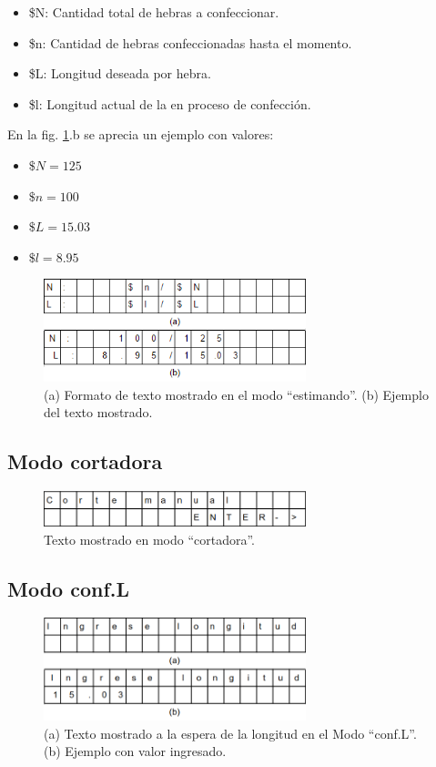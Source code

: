 \documentclass[main_conf.tex]{subfiles}
\begin{document}
\begin{itemize}
\item \$N: Cantidad total de hebras a confeccionar.
\item \$n: Cantidad de hebras confeccionadas hasta el momento.
\item \$L: Longitud deseada por hebra.
\item \$l: Longitud actual de la en proceso de confección.
\end{itemize}

En la fig. \ref{Modo_estimando}.b se aprecia un ejemplo con valores:
\begin{itemize}
\item $\$N = 125$
\item $\$n = 100$
\item $\$L = 15.03$
\item $\$l = 8.95$
\end{itemize}

\begin{figure}[!t]
  \centering
  \includegraphics[width=3.0in]{../img/modo/estimando.png}
  \caption{(a) Formato de texto mostrado en el modo “estimando”.
           (b) Ejemplo del texto mostrado.
  }
  \label{Modo_estimando}
\end{figure}

\subsection{Modo cortadora}

\begin{figure}[!t]
  \centering
  \includegraphics[width=3.0in]{../img/modo/cortadora.png}
  \caption{Texto mostrado en modo “cortadora”.}
  \label{Modo_cortadora}
\end{figure}

\subsection{Modo conf.L}

\begin{figure}[!t]
  \centering
  \includegraphics[width=3.0in]{../img/modo/Conf_L.png}
  \caption{(a) Texto mostrado a la espera de la longitud en el Modo “conf.L”.
           (b) Ejemplo con valor ingresado.
  }
  \label{Modo_Conf_L}
\end{figure}
\end{document}
